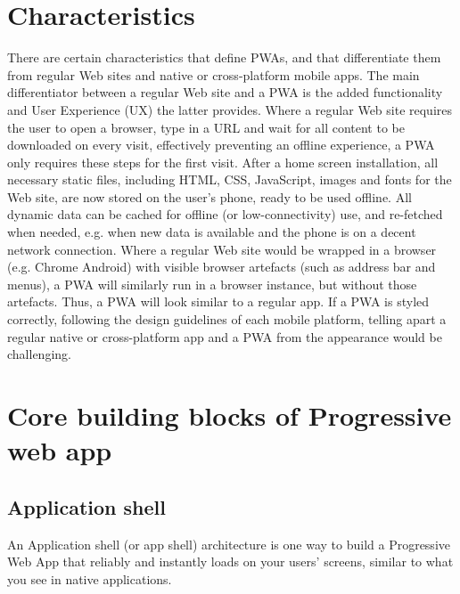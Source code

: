 \documentclass[14pt,a4paper,final]{extreport}
\begin{document}
\chapter{Characteristics}
\item 
There are certain characteristics that define PWAs, and that differentiate them from regular Web sites and native or cross-platform mobile apps. The main differentiator between a regular Web site and a PWA is the added functionality and User Experience (UX) the latter provides. Where a regular Web site requires the user to open a browser, type in a URL and wait for all content to be downloaded on every visit, effectively preventing an offline experience, a PWA only requires these steps for the first visit. After a home screen installation, all necessary static files, including HTML, CSS, JavaScript, images and fonts for the Web site, are now stored on the user’s phone, ready to be used offline. All dynamic data can be cached for offline (or low-connectivity) use, and re-fetched when needed, e.g. when new data is available and the phone is on a decent network connection.
Where a regular Web site would be wrapped in a browser (e.g. Chrome Android) with visible browser artefacts (such as address bar and menus), a PWA will similarly run in a browser instance, but without those artefacts. Thus, a PWA will look similar to a regular app. If a PWA is styled correctly, following the design guidelines of each mobile platform, telling apart a regular native or cross-platform app and a PWA from the appearance would be challenging.


\chapter{Core building blocks of Progressive web app}
\section{Application shell}
\item An Application shell (or app shell) architecture is one way to build a Progressive Web App that reliably and instantly loads on your users' screens, similar to what you see in native applications.
\end{document}
